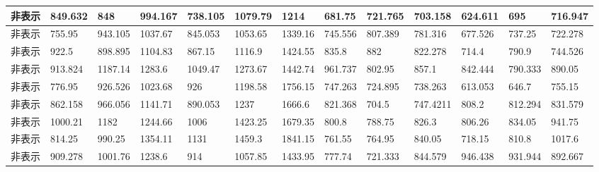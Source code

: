 \begin{tabularx}{\textwidth}{|c|L|L|L|L|L|L|L|L|L|L|L|L|}
    非表示                    & 849.632                      & 848                           & 994.167                       & 738.105                       & 1079.79     & 1214        & 681.75      & 721.765     & 703.158     & 624.611     & 695         & 716.947     \\ \hline
    非表示                    & 755.95                       & 943.105                       & 1037.67                       & 845.053                       & 1053.65     & 1339.16     & 745.556     & 807.389     & 781.316     & 677.526     & 737.25      & 722.278     \\ \hline
    非表示                    & 922.5                        & 898.895                       & 1104.83                       & 867.15                        & 1116.9      & 1424.55     & 835.8       & 882         & 822.278     & 714.4       & 790.9       & 744.526     \\ \hline
    非表示                    & 913.824                      & 1187.14                       & 1283.6                        & 1049.47                       & 1273.67     & 1442.74     & 961.737     & 802.95      & 857.1       & 842.444     & 790.333     & 890.05      \\ \hline
    非表示                    & 776.95                       & 926.526                       & 1023.68                       & 926                           & 1198.58     & 1756.15     & 747.263     & 724.895     & 738.263     & 613.053     & 646.7       & 755.15      \\ \hline
    非表示                    & 862.158                      & 966.056                       & 1141.71                       & 890.053                       & 1237        & 1666.6      & 821.368     & 704.5       & 747.4211    & 808.2       & 812.294     & 831.579     \\ \hline
    非表示                    & 1000.21                      & 1182                          & 1244.66                       & 1006                          & 1423.25     & 1679.35     & 800.8       & 788.75      & 826.3       & 806.26      & 834.05      & 941.75      \\ \hline
    非表示                    & 814.25                       & 990.25                        & 1354.11                       & 1131                          & 1459.3      & 1841.15     & 761.55      & 764.95      & 840.05      & 718.15      & 810.8       & 1017.6      \\ \hline
    非表示                    & 909.278                      & 1001.76                       & 1238.6                        & 914                           & 1057.85     & 1433.95     & 777.74      & 721.333     & 844.579     & 946.438     & 931.944     & 892.667     \\ \hline\hline

\end{tabularx}
